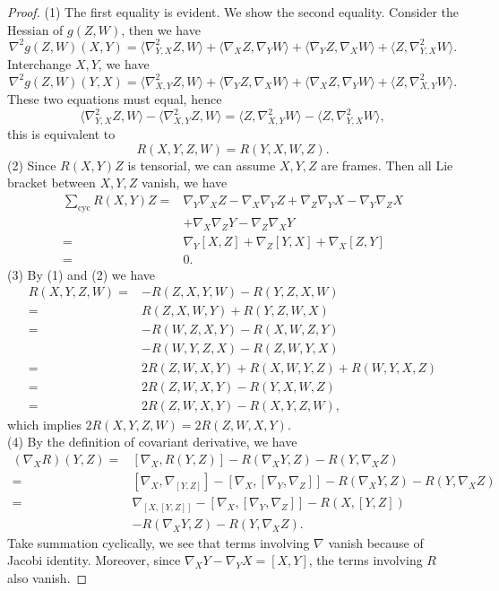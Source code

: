 \begin{proof}
    (1) The first equality is evident.
    We show the second equality.
    Consider the Hessian of $g(Z,W)$, then we have
    \[\nabla^2g(Z,W)(X,Y)=\langle\nabla^2_{Y,X}Z,W\rangle+\langle\nabla_XZ,\nabla_YW\rangle+\langle\nabla_YZ,\nabla_XW\rangle+\langle Z,\nabla^2_{Y,X}W\rangle.\]
    Interchange $X,Y$, we have
    \[\nabla^2g(Z,W)(Y,X)=\langle\nabla^2_{X,Y}Z,W\rangle+\langle\nabla_YZ,\nabla_XW\rangle+\langle\nabla_XZ,\nabla_YW\rangle+\langle Z,\nabla^2_{X,Y}W\rangle.\]
    These two equations must equal, hence
    \[\langle\nabla^2_{Y,X}Z,W\rangle-\langle\nabla^2_{X,Y}Z,W\rangle=\langle Z,\nabla^2_{X,Y}W\rangle-\langle Z,\nabla^2_{Y,X}W\rangle,\]
    this is equivalent to
    \[R(X,Y,Z,W)=R(Y,X,W,Z).\]
    (2) Since $R(X,Y)Z$ is tensorial, we can assume $X,Y,Z$ are frames.
    Then all Lie bracket between $X,Y,Z$ vanish, we have
    \begin{align*}
        \sum_{\text{cyc}}R(X,Y)Z=&\nabla_Y\nabla_XZ-\nabla_X\nabla_YZ+\nabla_Z\nabla_YX-\nabla_Y\nabla_ZX\\
        &+\nabla_X\nabla_ZY-\nabla_Z\nabla_XY\\
        =&\nabla_Y[X,Z]+\nabla_Z[Y,X]+\nabla_X[Z,Y]\\
        =&0.
    \end{align*}
    (3) By (1) and (2) we have
    \begin{align*}
        R(X,Y,Z,W)=&-R(Z,X,Y,W)-R(Y,Z,X,W)\\
        =&R(Z,X,W,Y)+R(Y,Z,W,X)\\
        =&-R(W,Z,X,Y)-R(X,W,Z,Y)\\
        &-R(W,Y,Z,X)-R(Z,W,Y,X)\\
        =&2R(Z,W,X,Y)+R(X,W,Y,Z)+R(W,Y,X,Z)\\
        =&2R(Z,W,X,Y)-R(Y,X,W,Z)\\
        =&2R(Z,W,X,Y)-R(X,Y,Z,W),
    \end{align*}
    which implies $2R(X,Y,Z,W)=2R(Z,W,X,Y)$.\\
    (4) By the definition of covariant derivative, we have
    \begin{align*}
        (\nabla_XR)(Y,Z)=&[\nabla_X,R(Y,Z)]-R(\nabla_XY,Z)-R(Y,\nabla_XZ)\\
        =&[\nabla_X,\nabla_{[Y,Z]}]-[\nabla_X,[\nabla_Y,\nabla_Z]]-R(\nabla_XY,Z)-R(Y,\nabla_XZ)\\
        =&\nabla_{[X,[Y,Z]]}-[\nabla_X,[\nabla_Y,\nabla_Z]]-R(X,[Y,Z])\\
        &-R(\nabla_XY,Z)-R(Y,\nabla_XZ).
    \end{align*}
    Take summation cyclically, we see that terms involving $\nabla$ vanish because of Jacobi identity.
    Moreover, since $\nabla_XY-\nabla_YX=[X,Y]$, the terms involving $R$ also vanish.
\end{proof}

